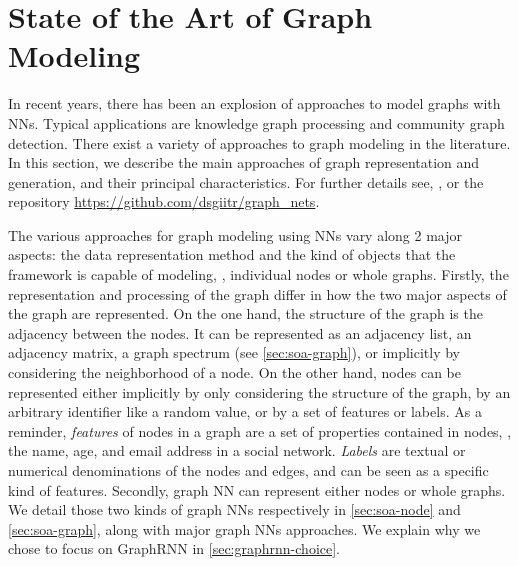 

\section{State of the Art of Graph Modeling\label{sec:graph-soa}}



In recent years, there has been an explosion of approaches to model graphs with NNs. Typical applications are knowledge graph processing and community graph detection.
There exist a variety of approaches to graph modeling in the literature. In this section, we describe the main approaches of graph representation and generation, and their principal characteristics.
For further details see, \eg, \cite{graph-nets:2019:many-authors} or the repository \url{https://github.com/dsgiitr/graph_nets}.

The various approaches for graph modeling using NNs vary along 2 major aspects: the data representation method and the kind of objects that the framework is capable of modeling, \eg, individual nodes or whole graphs.
%
Firstly, the representation and processing of the graph differ in how the two major aspects of the graph are represented.
On the one hand, the structure of the graph is the adjacency between the nodes. It can be represented as an adjacency list, an adjacency matrix, a graph spectrum (see \cref{sec:soa-graph}), or implicitly by considering the neighborhood of a node.
On the other hand, nodes can be represented either implicitly by only considering the structure of the graph, by an arbitrary identifier like a random value, or by a set of features or labels.
As a reminder, \textit{features} of nodes in a graph are a set of properties contained in nodes, \eg, the name, age, and email address in a social network.
\textit{Labels} are textual or numerical denominations of the nodes and edges, and can be seen as a specific kind of features.
%
Secondly, graph NN can represent either nodes or whole graphs.
We detail those two kinds of graph NNs respectively in \cref{sec:soa-node} and \cref{sec:soa-graph}, along with major graph NNs approaches.
We explain why we chose to focus on GraphRNN in \cref{sec:graphrnn-choice}.

